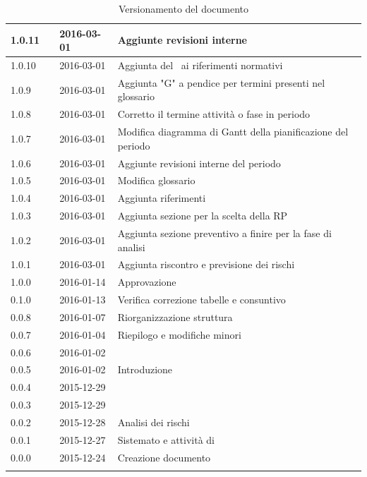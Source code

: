 \documentclass[12pt,a4paper]{article}
\begin{document}
\begin{center}
\begin{longtable}[H]{p{} p{} p{} p{}}
        \midrule
        1.0.11 & \AB{} & 2016-03-01 & Aggiunte revisioni interne \\*
		\midrule
		1.0.10 & \AB{} & 2016-03-01 & Aggiunta del \PdQ\ ai riferimenti normativi \\*		
		\midrule
		1.0.9 & \AB{} & 2016-03-01 & Aggiunta "G" a pendice per termini presenti nel glossario \\*
		\midrule
		1.0.8 & \AB{} & 2016-03-01 & Corretto il termine attività o fase in periodo \\*
		\midrule
		1.0.7 & \AB{} & 2016-03-01 & Modifica diagramma di Gantt della pianificazione del periodo \FP\  \\*
		\midrule
		1.0.6 & \AB{} & 2016-03-01 & Aggiunte revisioni interne del periodo \FP\ \\*
		\midrule
		1.0.5 & \AB{} & 2016-03-01 & Modifica glossario \\*
		\midrule
		1.0.4 & \AB{} & 2016-03-01 & Aggiunta riferimenti \\*
		\midrule
		1.0.3 & \AB{} & 2016-03-01 & Aggiunta sezione per la scelta della RP \\*
		\midrule
		1.0.2 & \AB{} & 2016-03-01 & Aggiunta sezione preventivo a finire per la fase di analisi \\*
		\midrule
		1.0.1 & \AB{} & 2016-03-01 & Aggiunta riscontro e previsione dei rischi \\*
		\midrule
		1.0.0 & \NDC{} & 2016-01-14 & Approvazione \\*
		\midrule
		0.1.0 & \AVE{} & 2016-01-13 & Verifica correzione tabelle e consuntivo  \FA{} \\*
		\midrule
		0.0.8 & \TP{} & 2016-01-07 & Riorganizzazione struttura \\*
		\midrule
		0.0.7 & \NDC{} & 2016-01-04 & Riepilogo e modifiche minori \\*
		\midrule
		0.0.6 & \WS{} & 2016-01-02 &  \FVV{} \\*
		\midrule
		0.0.5 & \WS{} & 2016-01-02 &  Introduzione \\*
		\midrule
		0.0.4 & \TP{} & 2015-12-29 &  \FPDC{} \\*
		\midrule
		0.0.3 & \TP{} & 2015-12-29 &  \FPA{} \\*
		\midrule
		0.0.2 & \NDC{} & 2015-12-28 &  Analisi dei rischi \\*
		\midrule
		0.0.1 & \NDC{} & 2015-12-27 &  Sistemato \mgls{template} e attività di \FA{} \\*
		\midrule
		0.0.0 & \NDC{} & 2015-12-24 &  Creazione documento \\*
		\bottomrule
		\caption{Versionamento del documento}
		\label{tabVers1}
	\end{longtable}
\end{center}
\end{document}
